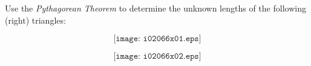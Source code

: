 

Use the {\it Pythagorean Theorem} to determine the unknown lengths of the following (right) triangles:

$$\texttt{[image: i02066x01.eps]}$$







$$\texttt{[image: i02066x02.eps]}$$











